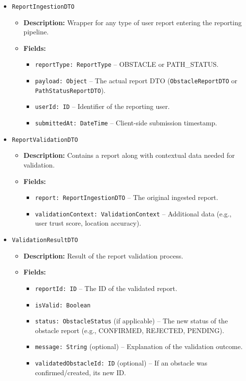 \begin{itemize}
    \item \texttt{ReportIngestionDTO}
    \begin{itemize}
        \item \textbf{Description:} Wrapper for any type of user report entering the reporting pipeline.
        \item \textbf{Fields:}
        \begin{itemize}
            \item \texttt{reportType: ReportType} – OBSTACLE or PATH\_STATUS.
            \item \texttt{payload: Object} – The actual report DTO (\texttt{ObstacleReportDTO} or \texttt{PathStatusReportDTO}).
            \item \texttt{userId: ID} – Identifier of the reporting user.
            \item \texttt{submittedAt: DateTime} – Client-side submission timestamp.
        \end{itemize}
    \end{itemize}

    \item \texttt{ReportValidationDTO}
    \begin{itemize}
        \item \textbf{Description:} Contains a report along with contextual data needed for validation.
        \item \textbf{Fields:}
        \begin{itemize}
            \item \texttt{report: ReportIngestionDTO} – The original ingested report.
            \item \texttt{validationContext: ValidationContext} – Additional data (e.g., user trust score, location accuracy).
        \end{itemize}
    \end{itemize}

    \item \texttt{ValidationResultDTO}
    \begin{itemize}
        \item \textbf{Description:} Result of the report validation process.
        \item \textbf{Fields:}
        \begin{itemize}
            \item \texttt{reportId: ID} – The ID of the validated report.
            \item \texttt{isValid: Boolean}
            \item \texttt{status: ObstacleStatus} (if applicable) – The new status of the obstacle report (e.g., CONFIRMED, REJECTED, PENDING).
            \item \texttt{message: String} (optional) – Explanation of the validation outcome.
            \item \texttt{validatedObstacleId: ID} (optional) – If an obstacle was confirmed/created, its new ID.
        \end{itemize}
    \end{itemize}
\end{itemize}

